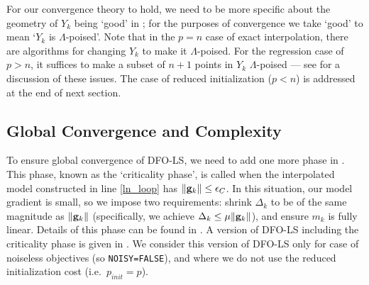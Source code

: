 For our convergence theory to hold, we need to be more specific about the geometry of $Y_k$ being `good' in ; for the purposes of convergence we take `good' to mean `$Y_k$ is $\Lambda$-poised'.
Note that in the $p=n$ case of exact interpolation, there are algorithms for changing $Y_k$ to make it $\Lambda$-poised.
For the regression case of $p>n$, it suffices to make a subset of $n+1$ points in $Y_k$ $\Lambda$-poised --- see \cite[Chapter 6]{Conn2009} for a discussion of these issues. The case of reduced initialization ($p<n$) is addressed at the end of next section.

\subsection{Global Convergence and Complexity}
To ensure global convergence of DFO-LS, we need to add one more phase in .
This phase, known as the `criticality phase', is called when the interpolated model constructed in line \ref{ln_loop} has $\|\mathbf{g}_k\|\leq\epsilon_C$.
In this situation, our model gradient is small, so we impose two requirements: shrink $\Delta_k$ to be of the same magnitude as $\|\mathbf{g}_k\|$ (specifically, we achieve $\Delta_k\leq \mu\|\mathbf{g}_k\|$), and ensure $m_k$ is fully linear.
Details of this phase can be found in \cite[Appendix B]{Cartis2017a}.
A version of DFO-LS including the criticality phase is given in .
We consider this version of DFO-LS only for case of noiseless objectives (so \texttt{NOISY=FALSE}), and where we do not use the reduced initialization cost (i.e.~$p_{init}=p$).

